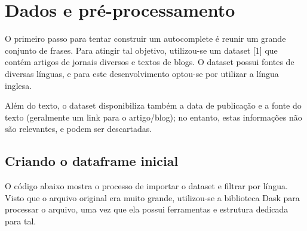 \documentclass[a4paper,11pt,final]{article}
\begin{document}
\section{Dados e pré-processamento}

O primeiro passo para tentar construir um autocomplete é reunir um grande conjunto de frases. Para atingir tal objetivo, utilizou-se um dataset [1] que contém artigos de jornais diversos e textos de blogs.
O dataset possui fontes de diversas línguas, e para este desenvolvimento optou-se por utilizar a língua inglesa.

Além do texto, o dataset disponibiliza também a data de publicação e a fonte do texto (geralmente um link para o artigo/blog); no entanto, estas informações não são relevantes, e podem ser descartadas.

\subsection{Criando o dataframe inicial}

O código abaixo mostra o processo de importar o dataset e filtrar por língua. Visto que o arquivo original era muito grande, utilizou-se a biblioteca Dask para processar o arquivo, uma vez que ela possui ferramentas e estrutura dedicada para tal.
\end{document}
